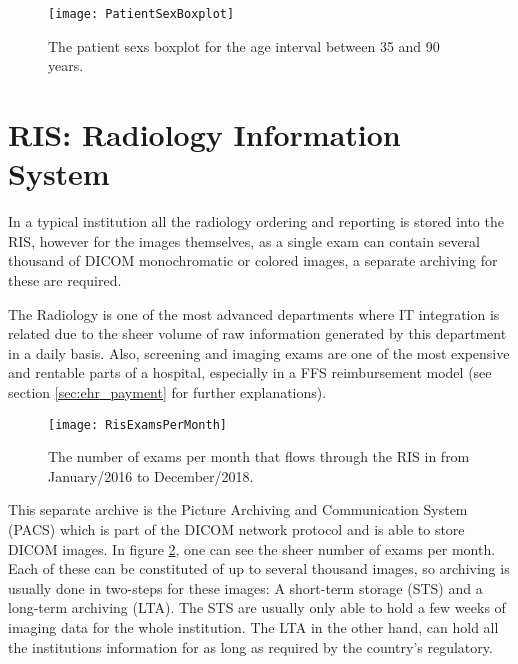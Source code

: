 \begin{center}
\begin{figure}
\begin{centering}
\texttt{[image: PatientSexBoxplot]}
\end{centering}
\caption{\label{fig:patient_sex_boxplot}The patient sexs boxplot for the age interval between 35 and 90 years.}
\end{figure}
\vspace*{-44pt}
\end{center}

\section{RIS: Radiology Information System}

In a typical institution all the radiology ordering and reporting is stored into the RIS, however for the images themselves, as a single exam can contain several thousand of DICOM monochromatic or colored images, a separate archiving for these are required. 

The Radiology is one of the most advanced departments where IT integration is related due to the sheer volume of raw information generated by this department in a daily basis. Also, screening and imaging exams are one of the most expensive and rentable parts of a hospital, especially in a FFS reimbursement model (see section \ref{sec:ehr_payment} for further explanations).

\begin{center}
\begin{figure}
\begin{centering}
\texttt{[image: RisExamsPerMonth]}
\end{centering}
\caption{\label{fig:ris_exams_per_month} The number of exams per month that flows through the RIS in \nomeHslShort{} from January/2016 to December/2018.}
\end{figure}
\vspace*{-44pt}
\end{center}

This separate archive is the Picture Archiving and Communication System (PACS) which is part of the DICOM network protocol and is able to store DICOM images\cite{clunie2000, mildenberger2002}. In figure \ref{fig:ris_exams_per_month}, one can see the sheer number of exams per month. Each of these can be constituted of up to several thousand images, so archiving is usually done in two-steps for these images: A short-term storage (STS) and a long-term archiving (LTA). The STS are usually only able to hold a few weeks of imaging data for the whole institution. The LTA in the other hand, can hold all the institutions information for as long as required by the country's regulatory.

